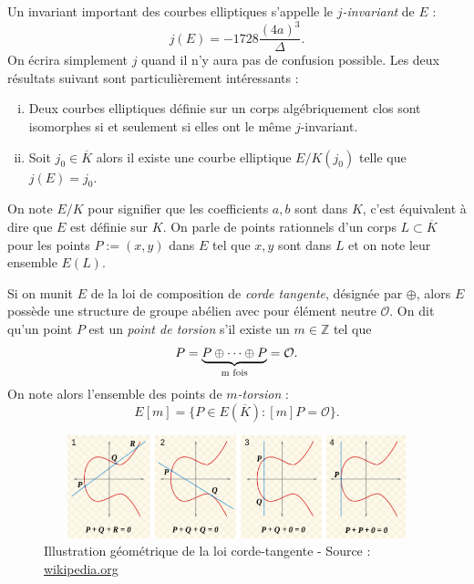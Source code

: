 \documentclass[a4paper]{article} %
\numberwithin{section}{part}
\numberwithin{equation}{section}
\newcommand\ZZ{\mathbb{Z}}
\newcommand\EO{\mathcal{O}}
\begin{document}
Un invariant important des courbes elliptiques s'appelle le \emph{$j$-invariant}
de $E$ :
\begin{equation}
j(E) = -1728\dfrac{(4a)^3}{\Delta}.
\end{equation}
On écrira simplement $j$ quand il n'y aura pas de confusion possible. Les deux
résultats suivant sont particulièrement intéressants :
\begin{prop}
\label{prop:j-invariant}
\begin{enumerate}[(i)]
    \item Deux courbes elliptiques définie sur un corps algébriquement clos 
        sont isomorphes si et seulement si elles ont le même $j$-invariant.
    \item Soit $j_0\in\overline{K}$ alors il existe une courbe elliptique
    $E/K(j_0)$ telle que $j(E) = j_0$.
\end{enumerate}
\end{prop}
On note $E/K$ pour signifier que les coefficients $a, b$ sont dans $K$, c'est
équivalent à dire que $E$ est définie sur $K$. On parle de points rationnels 
d'un corps $L\subset\overline{K}$ pour les points
$P := (x,y)$ dans $E$ tel que $x, y$ sont dans $L$ et on note leur ensemble
$E(L)$.\par
\vspace{0.3cm}
Si on munit $E$ de la loi de composition de \emph{corde tangente}, désignée par
$\oplus$, alors $E$ possède une structure de groupe abélien avec pour élément 
neutre $\EO$. On dit qu'un point $P$ est un \emph{point de torsion} s'il existe 
un $m\in\ZZ$ tel que 
\begin{equation}
[m]P = \underbrace{P\oplus\dots\oplus P}_{\textup{m fois}} = \EO.
\end{equation}
On note alors l'ensemble des points de \emph{$m$-torsion} :
\begin{equation}
E[m] = \lbrace{P\in E(\overline{K}) : [m]P = \EO}\rbrace.
\end{equation}

\begin{figure}[H]
\begin{center}
\includegraphics[width=12cm, height=3cm]{CordeTangente}
\caption{Illustration géométrique de la loi corde-tangente - Source : 
\href{http://en.wikipedia.org/wiki/Elliptic_curve}{wikipedia.org}}
\label{fig:cordetangente}
\end{center}
\end{figure}
\end{document}
